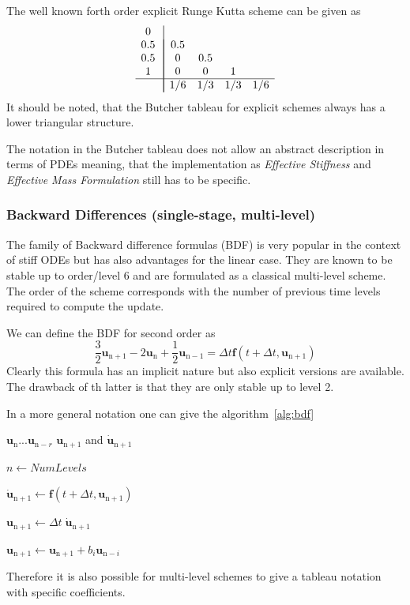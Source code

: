 The well known forth order explicit Runge Kutta scheme can be given as
\begin{equation}
\begin{array}{c|!{\vrule width 0.5pt}cccc}
0 &  & & & \\
0.5 & 0.5 & & & \\
0.5 & 0 & 0.5 & & \\
1 & 0 & 0 & 1 & \\
\hline
& 1/6 & 1/3 & 1/3 & 1/6
\end{array}
\end{equation}
It should be noted, that the Butcher tableau for explicit schemes always has a lower triangular
structure.

The notation in the Butcher tableau does not allow an abstract description in terms of PDEs meaning,
that the implementation as {\it Effective Stiffness} and  {\it Effective Mass Formulation} still has
to be specific.
\subsubsection[BDF Schemes]{Backward Differences (single-stage, multi-level)}
The family of Backward difference formulas (BDF) is very popular in the context of stiff ODEs but has also
advantages for the linear case. They are known to be stable up to order/level 6 and are formulated as a
classical multi-level scheme. The order of the scheme corresponds with the number of previous time
levels required to compute the update.

We can define the BDF for second order as
\begin{equation}
\frac{3}{2}\mathbf{u}_{\mathrm{n}+1} - 2 \mathbf{u}_{\mathrm{n}} + \frac{1}{2}\mathbf{u}_{\mathrm{n}-1} = \Delta t \mathbf{f}(t+\Delta t,
\mathbf{u}_{\mathrm{n}+1})
\end{equation}
Clearly this formula has an implicit nature but also explicit versions are available. The drawback
of th latter is that they are only stable up to level 2.

In a more general notation one can give the algorithm~\ref{alg:bdf}
\begin{algorithm}
\caption{r-level BDF} \label{alg:bdf}
\begin{algorithmic}
\REQUIRE $\mathbf{u}_{\mathrm{n}} ... \mathbf{u}_{\mathrm{n}-r}$
\ENSURE  $\mathbf{u}_{\mathrm{n}+1}$ and $\mathbf{\dot{u}}_{\mathrm{n}+1}$

\STATE $n \gets NumLevels$

\STATE {}
\STATE $\mathbf{\dot{u}}_{\mathrm{n}+1} \gets \mathbf{f}(t+\Delta t,\mathbf{u}_{\mathrm{n}+1})$

\STATE $\mathbf{u}_{\mathrm{n}+1} \gets \Delta t\; \mathbf{\dot{u}}_{\mathrm{n}+1}$

\STATE $\mathbf{u}_{\mathrm{n}+1} \gets  \mathbf{u}_{\mathrm{n}+1} + b_i \mathbf{u}_{\mathrm{n}-i}$ 
\ENDFOR

\end{algorithmic}
\end{algorithm}
Therefore it is also possible for multi-level schemes to give a tableau notation with specific
coefficients.

